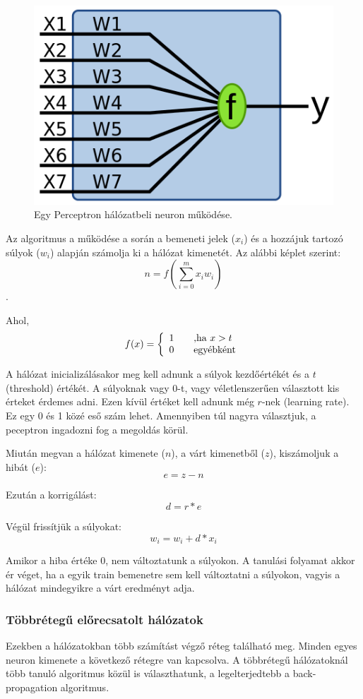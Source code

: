 \documentclass[a4paper]{article}
\begin{document}
\begin{figure}
  \centering
  \includegraphics[scale=0.3]{Perceptron}
  \caption{Egy Perceptron hálózatbeli neuron működése.}
  \label{forward_neuron}
\end{figure}

Az algoritmus a működése a során a bemeneti jelek ($x_{i}$) és a hozzájuk tartozó súlyok ($w_{i}$) alapján számolja ki a hálózat kimenetét. Az alábbi képlet szerint:
$${ n = f(\sum_{i=0}^{m} x_{i}w_{i})}$$.

Ahol, 
\[ f(x) = \left\{
  \begin{array}{l l}
    1 & \quad \textrm{,ha $x > t$}\\
    0 & \quad \textrm{egyébként}
  \end{array} \right.\]

A hálózat inicializálásakor meg kell adnunk a súlyok kezdőértékét és a $t$ (threshold) értékét. A súlyoknak vagy 0-t, vagy véletlenszerűen választott kis érteket érdemes adni. Ezen kívül értéket kell adnunk még $r$-nek (learning rate). Ez egy 0 és 1 közé eső szám lehet. Amennyiben túl nagyra választjuk, a peceptron ingadozni fog a megoldás körül.

Miután megvan a hálózat kimenete ($n$), a várt kimenetből ($z$), kiszámoljuk a hibát ($e$):
$$e = z - n$$

Ezután a korrigálást:
$$d = r * e $$

Végül frissítjük a súlyokat:
$$w_{i} = w_{i} + d * x_{i}$$

Amikor a hiba értéke 0, nem változtatunk a súlyokon. A tanulási folyamat akkor ér véget, ha a egyik train bemenetre sem kell változtatni a súlyokon, vagyis a hálózat mindegyikre a várt eredményt adja.

\subsubsection{Többrétegű előrecsatolt hálózatok}
Ezekben a hálózatokban több számítást végző réteg található meg. Minden egyes neuron kimenete a következő rétegre van kapcsolva. A többrétegű hálózatoknál több tanuló algoritmus közül is választhatunk, a legelterjedtebb a back-propagation algoritmus.
\end{document}
